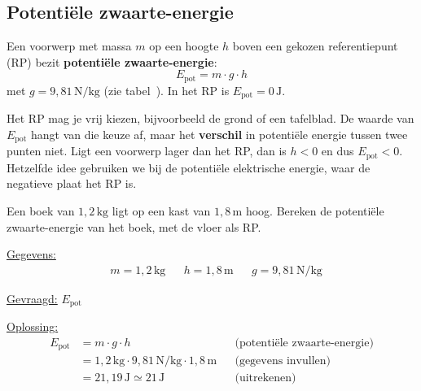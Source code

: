 \documentclass{ximera}
\begin{document}
\subsection{Potentiële zwaarte-energie}
\begin{definition}[title={Potentiële zwaarte-energie}]\nl
    Een voorwerp met massa $m$ op een hoogte $h$ boven een gekozen referentiepunt (RP) bezit \textbf{potentiële zwaarte-energie}:
    \begin{equation}\label{eq:epot_zwaarte}
        E_{\text{pot}} = m \cdot g \cdot h
    \end{equation}
    met $g = 9{,}81 \, \mathrm{N/kg}$ (zie tabel~). In het RP is $E_{\text{pot}} = 0 \, \mathrm{J}$.
\end{definition}

\begin{remark}[title={Kies zelf het referentiepunt}]\nl
    Het RP mag je vrij kiezen, bijvoorbeeld de grond of een tafelblad. De waarde van $E_{\text{pot}}$ hangt van die keuze af, maar het \textbf{verschil} in potentiële energie tussen twee punten niet. Ligt een voorwerp lager dan het RP, dan is $h < 0$ en dus $E_{\text{pot}} < 0$. Hetzelfde idee gebruiken we bij de potentiële elektrische energie, waar de negatieve plaat het RP is.
\end{remark}

\begin{example}[foldable=true,title={Voorbeeld: een boek op een kast}]\nl
    Een boek van $1{,}2 \, \mathrm{kg}$ ligt op een kast van $1{,}8 \, \mathrm{m}$ hoog. Bereken de potentiële zwaarte-energie van het boek, met de vloer als RP.

    \begin{solution}\nl
        \underline{Gegevens:}
        \begin{align*}
            & m = 1{,}2 \, \mathrm{kg} & & h = 1{,}8 \, \mathrm{m} & & g = 9{,}81 \, \mathrm{N/kg}
        \end{align*}

        \underline{Gevraagd:} $E_{\text{pot}}$

        \underline{Oplossing:}
        \begin{align*}
            E_{\text{pot}} &= m \cdot g \cdot h && \text{(potentiële zwaarte-energie)}\\
            &= 1{,}2 \, \mathrm{kg} \cdot 9{,}81 \, \mathrm{N/kg} \cdot 1{,}8 \, \mathrm{m} && \text{(gegevens invullen)}\\
            &= 21{,}19 \, \mathrm{J} \simeq \boxed{21 \, \mathrm{J}} && \text{(uitrekenen)}
        \end{align*}
    \end{solution}
\end{example}
\end{document}
